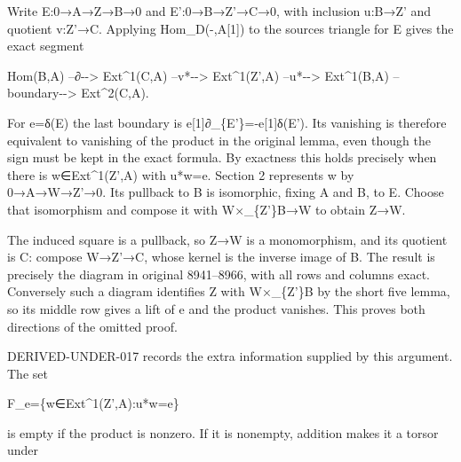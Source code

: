 \documentclass[11pt]{article}
\begin{document}
Write E:\allowbreak{}0\allowbreak{}→A\allowbreak{}→Z\allowbreak{}→B\allowbreak{}→0 and E':\allowbreak{}0\allowbreak{}→B\allowbreak{}→Z'\allowbreak{}→C\allowbreak{}→0,\allowbreak{} with inclusion u:\allowbreak{}B\allowbreak{}→Z' and quotient v:\allowbreak{}Z'\allowbreak{}→C. Applying Hom\_\allowbreak{}D(-,\allowbreak{}A[1]\allowbreak{})\allowbreak{} to the source\textquotesingle s triangle for E\textquotesingle{} gives the exact segment

Hom(B,\allowbreak{}A)\allowbreak{} --∂-\allowbreak{}-> Ext\textasciicircum{}1(C,\allowbreak{}A)\allowbreak{} --v*-\allowbreak{}-> Ext\textasciicircum{}1(Z',\allowbreak{}A)\allowbreak{} --u*-\allowbreak{}-> Ext\textasciicircum{}1(B,\allowbreak{}A)\allowbreak{} --boundary-\allowbreak{}-> Ext\textasciicircum{}2(C,\allowbreak{}A)\allowbreak{}.

For e\allowbreak{}=δ(E)\allowbreak{} the last boundary is e[1]\allowbreak{}∂\_\allowbreak{}\{E'\}\allowbreak{}=-e[1]\allowbreak{}δ(E')\allowbreak{}. Its vanishing is therefore equivalent to vanishing of the product in the original lemma,\allowbreak{} even though the sign must be kept in the exact formula. By exactness this holds precisely when there is w\allowbreak{}∈Ext\textasciicircum{}1(Z',\allowbreak{}A)\allowbreak{} with u*w\allowbreak{}=e. Section 2 represents w by 0\allowbreak{}→A\allowbreak{}→W\allowbreak{}→Z'\allowbreak{}→0. Its pullback to B is isomorphic,\allowbreak{} fixing A and B,\allowbreak{} to E. Choose that isomorphism and compose it with W×\_\allowbreak{}\{Z'\}B\allowbreak{}→W to obtain Z\allowbreak{}→W.

The induced square is a pullback,\allowbreak{} so Z\allowbreak{}→W is a monomorphism,\allowbreak{} and its quotient is C:\allowbreak{} compose W\allowbreak{}→Z'\allowbreak{}→C,\allowbreak{} whose kernel is the inverse image of B. The result is precisely the diagram in original 8941–\allowbreak{}8966,\allowbreak{} with all rows and columns exact. Conversely such a diagram identifies Z with W×\_\allowbreak{}\{Z'\}B by the short five lemma,\allowbreak{} so its middle row gives a lift of e and the product vanishes. This proves both directions of the omitted proof.

DERIVED-UNDER-017 records the extra information supplied by this argument. The set

F\_\allowbreak{}e\allowbreak{}=\{w\allowbreak{}∈Ext\textasciicircum{}1(Z',\allowbreak{}A)\allowbreak{}:\allowbreak{}u*w\allowbreak{}=e\}

is empty if the product is nonzero. If it is nonempty,\allowbreak{} addition makes it a torsor under
\end{document}

